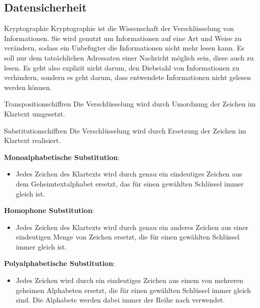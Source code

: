 \documentclass[german]{spicker}
\begin{document}
\subsection{Datensicherheit}

\begin{defi}{Kryptographie}
    Kryptographie ist die Wissenschaft der Verschlüsselung von Informationen. Sie wird genutzt
    um Informationen auf eine Art und Weise zu verändern, sodass ein Unbefugter
    die Informationen nicht mehr lesen kann. Es soll nur dem tatsächlichen Adressaten
    einer Nachricht möglich sein, diese auch zu lesen. Es geht also explizit nicht darum,
    den Diebstahl von Informationen zu verhindern, sondern es geht darum, dass
    entwendete Informationen nicht gelesen werden können.
\end{defi}

\begin{defi}{Transpositionschiffren}
    Die Verschlüsselung wird durch Umordnung der Zeichen
    im Klartext umgesetzt.
\end{defi}

\begin{defi}{Substitutionschiffren}
    Die Verschlüsselung wird durch Ersetzung der Zeichen
    im Klartext realisiert.

    \textbf{Monoalphabetische Substitution}:
    \begin{itemize}
        \item Jedes Zeichen des Klartexts wird durch genau
              ein eindeutiges Zeichen aus dem Geheimtextalphabet ersetzt, das für einen
              gewählten Schlüssel immer gleich ist.
    \end{itemize}

    \textbf{Homophone Substitution}:
    \begin{itemize}
        \item Jedes Zeichen des Klartexts wird durch genau ein
              anderes Zeichen aus einer eindeutigen Menge von Zeichen ersetzt, die für einen
              gewählten Schlüssel immer gleich ist.
    \end{itemize}

    \textbf{Polyalphabetische Substitution}:
    \begin{itemize}
        \item Jedes Zeichen wird durch ein eindeutiges Zeichen
              aus einem von mehreren geheimen Alphabeten ersetzt, die für einen gewählten
              Schlüssel immer gleich sind. Die Alphabete werden dabei immer der Reihe nach
              verwendet.
    \end{itemize}
\end{defi}
\end{document}
